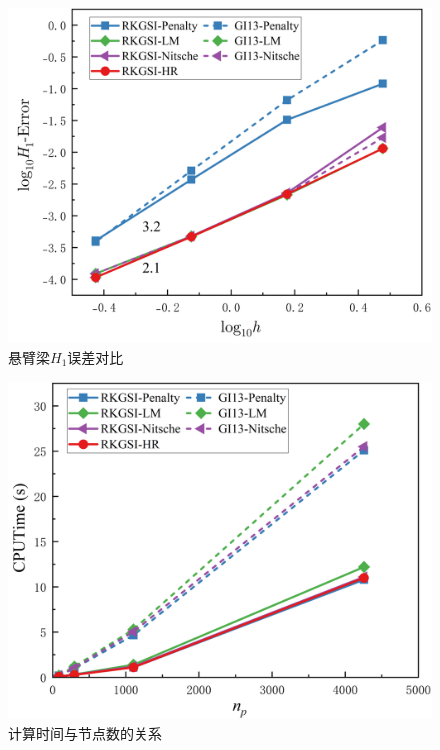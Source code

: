 \newpage
\begin{figure}[H]
    \centering
    \includegraphics[scale=0.5]{figure/EHR/cantilever/H1.png}
    \caption{悬臂梁$H_1$误差对比}\label{CH1}
\end{figure}
\begin{figure}[H]
    \centering
    \includegraphics[scale=0.5]{figure/EHR/cantilever/cputime.png}
    \caption{计算时间与节点数的关系}\label{Ccputime}
\end{figure}
\newpage
